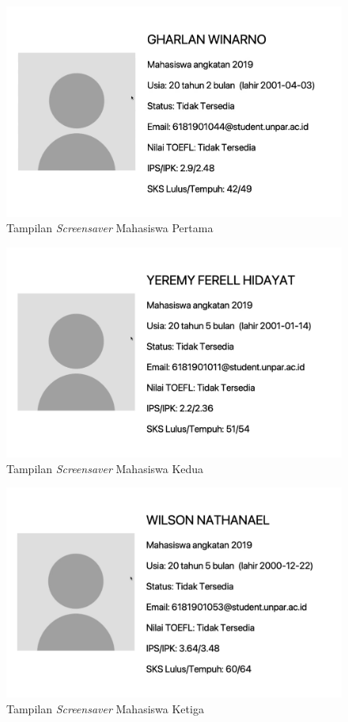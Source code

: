 \begin{figure}[H]
	\centering
	\includegraphics[scale=0.25]{Gambar/ss1.png}
	\caption{Tampilan \textit{Screensaver} Mahasiswa Pertama}
	\label{fig:5_ss1}
\end{figure}

\begin{figure}[H]
	\centering
	\includegraphics[scale=0.3]{Gambar/ss2.png}
	\caption{Tampilan \textit{Screensaver} Mahasiswa Kedua}
	\label{fig:5_ss2}
\end{figure}

\begin{figure}[H]
	\centering
	\includegraphics[scale=0.3]{Gambar/ss3.png}
	\caption{Tampilan \textit{Screensaver} Mahasiswa Ketiga}
	\label{fig:5_ss3}
\end{figure}


